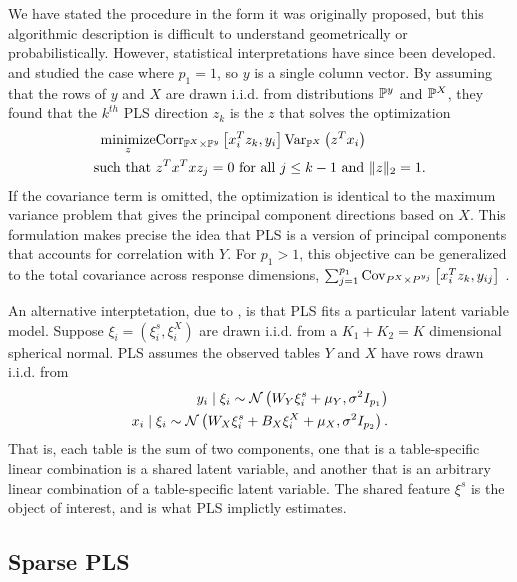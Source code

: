 \documentclass{article}
\begin{document}
We have stated the procedure in the form it was originally proposed, but this
algorithmic description is difficult to understand geometrically or
probabilistically. However, statistical interpretations have since been
developed. \citep{frank1993statistical} and \citep{stone1990continuum} studied
the case where $p_{1} = 1$, so $y$ is a single column vector. By assuming that
the rows of $y$ and $X$ are drawn i.i.d. from distributions $\P^{y}$ and
$\P^{X}$, they found that the $k^{th}$ PLS direction $z_{k}$ is the $z$ that
solves the optimization
\begin{align}
  \label{eq:pls_obj}
\maximize_{z} & \Corrsubarg{\P^{X} \times \P^{y}}{x_{i}^{T}z_{k},
y_{i}}\Varsubarg{\P^{X}}{z^{T}x_i} \\
\text{such that }&z^{T}x^{T}x z_{j} = 0 \text{ for all }j
\leq k - 1 \text{ and }
\|z\|_2 = 1.
\end{align}
If the covariance term is omitted, the optimization is identical to the maximum
variance problem that gives the principal component directions based on $X$.
This formulation makes precise the idea that PLS is a version of principal
components that accounts for correlation with $Y$. For $p_1 > 1$, this objective
can be generalized to the total covariance across response dimensions, $\sum_{j
  = 1}^{p_1} \Covsubarg{P^X \times P^{y_j}}{x_i^T z_k, y_{ij}}$
\citep{chun2010sparse}.

An alternative interptetation, due to \citep{gustafsson2001probabilistic}, is
that PLS fits a particular latent variable model. Suppose $\xi_{i} =
\left(\xi_{i}^{s}, \xi_{i}^{X}\right)$ are drawn i.i.d. from a $K_{1} + K_{2} =
K$ dimensional spherical normal. PLS assumes the observed tables $Y$ and $X$
have rows drawn i.i.d. from
\begin{align*}
y_{i} \mid \xi_{i} \sim \Gsn\left(W_{Y}\xi_{i}^{s} +
\mu_{Y}, \sigma^{2}I_{p_{1}}\right) \\
x_{i} \mid \xi_{i} \sim \Gsn\left(W_{X} \xi_{i}^{s} + B_{X}\xi_{i}^{X} +
\mu_{X}, \sigma^{2}I_{p_{2}}\right).
\end{align*}
That is, each table is the sum of two components, one that is a
table-specific linear combination is a shared latent variable, and
another that is an arbitrary linear combination of a table-specific
latent variable. The shared feature $\xi^{s}$ is the object of
interest, and is what PLS implictly estimates.

\subsection{Sparse PLS}
\label{subsec:spls}
\end{document}
